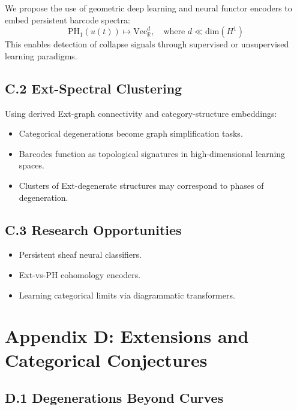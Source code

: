 \documentclass[11pt]{article}
\begin{document}
We propose the use of geometric deep learning and neural functor encoders to embed persistent barcode spectra:
\[
\mathrm{PH}_1(u(t)) \mapsto \mathrm{Vec}_\mathbb{R}^d, \quad \text{where } d \ll \text{dim}(H^1)
\]
This enables detection of collapse signals through supervised or unsupervised learning paradigms.

\subsection*{C.2 Ext-Spectral Clustering}

Using derived Ext-graph connectivity and category-structure embeddings:
\begin{itemize}
    \item Categorical degenerations become graph simplification tasks.
    \item Barcodes function as topological signatures in high-dimensional learning spaces.
    \item Clusters of Ext-degenerate structures may correspond to phases of degeneration.
\end{itemize}

\subsection*{C.3 Research Opportunities}

\begin{itemize}
    \item Persistent sheaf neural classifiers.
    \item Ext-vs-PH cohomology encoders.
    \item Learning categorical limits via diagrammatic transformers.
\end{itemize}


\section*{Appendix D: Extensions and Categorical Conjectures}

\subsection*{D.1 Degenerations Beyond Curves}
\end{document}
